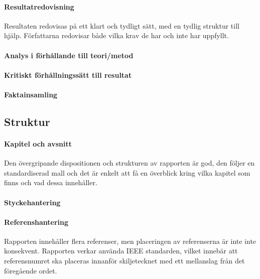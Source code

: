     \paragraph{Resultatredovisning}
        Resultaten redovisas på ett klart och tydligt sätt, med en tydlig struktur till hjälp. Författarna redovisar både vilka krav de har och inte har uppfyllt.

    \paragraph{Analys i förhållande till teori/metod  }
        

    \paragraph{Kritiskt förhållningssätt till resultat}

    \paragraph{Faktainsamling}


    \subsection{Struktur} %
    \label{sub:struktur}
    \paragraph{Kapitel och avsnitt}
        Den övergripande dispositionen och strukturen av rapporten är god, den följer en standardiserad mall och det är enkelt att få en överblick kring vilka kapitel som finns och vad dessa innehåller. \bigskip
     
    \paragraph{Styckehantering}

    \paragraph{Referenshantering}
         Rapporten innehåller flera referenser, men placeringen av referenserna är inte inte konsekvent. Rapporten verkar använda IEEE standarden, vilket innebär att referensnumret ska placeras innanför skiljetecknet med ett mellanslag från det föregående ordet.
    
